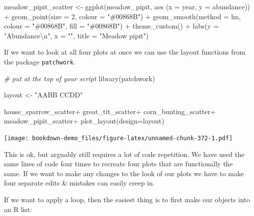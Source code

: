 \documentclass[
]{book}
\newenvironment{Shaded}{\begin{snugshade}}{\end{snugshade}}
\newcommand{\AttributeTok}[1]{\textcolor[rgb]{0.77,0.63,0.00}{#1}}
\newcommand{\CommentTok}[1]{\textcolor[rgb]{0.56,0.35,0.01}{\textit{#1}}}
\newcommand{\DecValTok}[1]{\textcolor[rgb]{0.00,0.00,0.81}{#1}}
\newcommand{\FunctionTok}[1]{\textcolor[rgb]{0.00,0.00,0.00}{#1}}
\newcommand{\NormalTok}[1]{#1}
\newcommand{\OtherTok}[1]{\textcolor[rgb]{0.56,0.35,0.01}{#1}}
\newcommand{\SpecialCharTok}[1]{\textcolor[rgb]{0.00,0.00,0.00}{#1}}
\newcommand{\StringTok}[1]{\textcolor[rgb]{0.31,0.60,0.02}{#1}}
\begin{document}
\begin{Shaded}
\begin{Highlighting}[]
\NormalTok{meadow\_pipit\_scatter }\OtherTok{\textless{}{-}} \FunctionTok{ggplot}\NormalTok{(meadow\_pipit, }\FunctionTok{aes}\NormalTok{ (}\AttributeTok{x =}\NormalTok{ year, }\AttributeTok{y =}\NormalTok{ abundance)) }\SpecialCharTok{+}
    \FunctionTok{geom\_point}\NormalTok{(}\AttributeTok{size =} \DecValTok{2}\NormalTok{, }\AttributeTok{colour =} \StringTok{"\#00868B"}\NormalTok{) }\SpecialCharTok{+}                                                
    \FunctionTok{geom\_smooth}\NormalTok{(}\AttributeTok{method =}\NormalTok{ lm, }\AttributeTok{colour =} \StringTok{"\#00868B"}\NormalTok{, }\AttributeTok{fill =} \StringTok{"\#00868B"}\NormalTok{) }\SpecialCharTok{+}          
    \FunctionTok{theme\_custom}\NormalTok{() }\SpecialCharTok{+}
    \FunctionTok{labs}\NormalTok{(}\AttributeTok{y =} \StringTok{"Abundance}\SpecialCharTok{\textbackslash{}n}\StringTok{"}\NormalTok{, }\AttributeTok{x =} \StringTok{""}\NormalTok{, }\AttributeTok{title =} \StringTok{"Meadow pipit"}\NormalTok{)}
\end{Highlighting}
\end{Shaded}

If we want to look at all four plots at once we can use the layout functions from the package \texttt{patchwork}.

\begin{Shaded}
\begin{Highlighting}[]
\CommentTok{\# put at the top of your script}
\FunctionTok{library}\NormalTok{(patchwork)}

\NormalTok{layout }\OtherTok{\textless{}{-}} \StringTok{"AABB}
\StringTok{           CCDD"}

\NormalTok{house\_sparrow\_scatter}\SpecialCharTok{+}
\NormalTok{  great\_tit\_scatter}\SpecialCharTok{+}
\NormalTok{  corn\_bunting\_scatter}\SpecialCharTok{+}
\NormalTok{  meadow\_pipit\_scatter}\SpecialCharTok{+}
  \FunctionTok{plot\_layout}\NormalTok{(}\AttributeTok{design=}\NormalTok{layout)}
\end{Highlighting}
\end{Shaded}

\texttt{[image: bookdown-demo\_files/figure-latex/unnamed-chunk-372-1.pdf]}

This is ok, but arguably still requires a lot of code repetition. We have used the same lines of code four times to recreate four plots that are functionally the same. If we want to make any changes to the look of our plots we have to make four separate edits \& mistakes can easily creep in.

If we want to apply a loop, then the easiest thing is to first make our objects into an R list:
\end{document}
